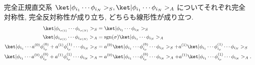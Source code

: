 \documentclass[uplatex,dvipdfmx,a4paper,11pt]{jlreq}
\DeclareMathOperator{\sgn}{sgn}
\numberwithin{equation}{section}
\theoremstyle{definition}
\begin{document}
\begin{proposition}
  完全正規直交系 $\ket|\phi_{i_1}\cdots\phi_{i_N}>_S, \ket|\phi_{i_1}\cdots\phi_{i_N}>_A$ についてそれぞれ完全対称性, 完全反対称性が成り立ち, どちらも線形性が成り立つ.
  \begin{align}
    \ket|\phi_{i_{\sigma(1)}}\cdots\phi_{i_{\sigma(N)}}>_S                                         & = \ket|\phi_{i_1}\cdots\phi_{i_N}>_S                                                                                                     \\
    \ket|\phi_{i_{\sigma(1)}}\cdots\phi_{i_{\sigma(N)}}>_A                                         & = \sgn(\sigma)\ket|\phi_{i_1}\cdots\phi_{i_N}>_A                                                                                         \\
    \ket|\phi_{i_1}\cdots a^{(0)}\phi_{i_\mu}^{(0)} + a^{(1)}\phi_{i_\mu}^{(1)}\cdots\phi_{i_N}>_S & = a^{(0)}\ket|\phi_{i_1}\cdots\phi_{i_\mu}^{(0)}\cdots\phi_{i_N}>_S + a^{(1)}\ket|\phi_{i_1}\cdots\phi_{i_\mu}^{(1)}\cdots\phi_{i_N}>_S  \\
    \ket|\phi_{i_1}\cdots a^{(0)}\phi_{i_\mu}^{(0)} + a^{(1)}\phi_{i_\mu}^{(1)}\cdots\phi_{i_N}>_A & = a^{(0)}\ket|\phi_{i_1}\cdots\phi_{i_\mu}^{(0)}\cdots\phi_{i_N}>_A + a^{(1)}\ket|\phi_{i_1}\cdots\phi_{i_\mu}^{(1)}\cdots\phi_{i_N}>_A.
  \end{align}
\end{proposition}
\end{document}
